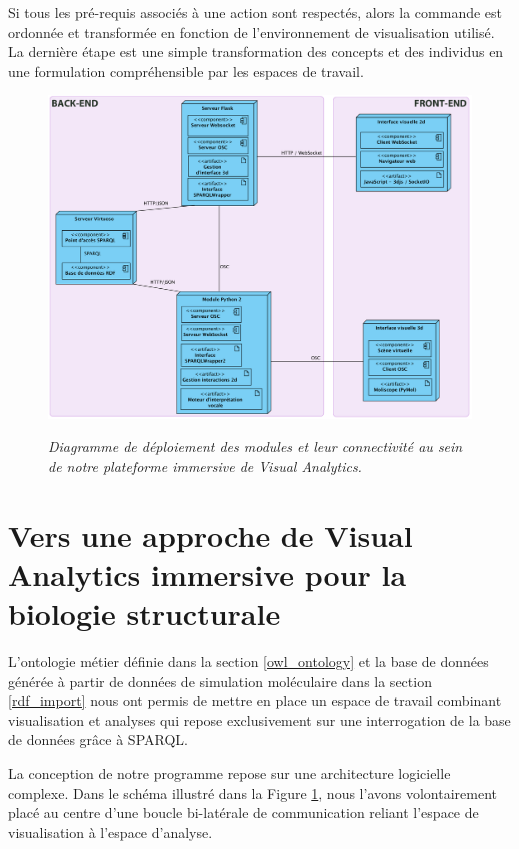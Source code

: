 Si tous les pré-requis associés à une action sont respectés, alors la commande est ordonnée et transformée en fonction de l'environnement de visualisation utilisé. La dernière étape est une simple transformation des concepts et des individus en une formulation compréhensible par les espaces de travail.

\begin{figure}[htb]
  \centering
  {\includegraphics[width=.95\linewidth]{./figures/ch5/platform_architecture_def}}
    \caption[Diagramme de déploiement de notre plateforme de \textit{Visual Analytics} immersive.]{{\it Diagramme de déploiement des modules et leur connectivité au sein de notre plateforme immersive de Visual Analytics.}}
  \label{Fig:platform_architecture}
  \hspace{0.3cm}
\end{figure}


\section{Vers une approche de Visual Analytics immersive pour la biologie structurale}

L'ontologie métier définie dans la section \ref{owl_ontology} et la base de données générée à partir de données de simulation moléculaire dans la section \ref{rdf_import} nous ont permis de mettre en place un espace de travail combinant visualisation et analyses qui repose exclusivement sur une interrogation de la base de données grâce à SPARQL.

La conception de notre programme repose sur une architecture logicielle complexe. Dans le schéma illustré dans la Figure \ref{Fig:platform_architecture}, nous l'avons volontairement placé au centre d'une boucle bi-latérale de communication reliant l'espace de visualisation à l'espace d'analyse.

